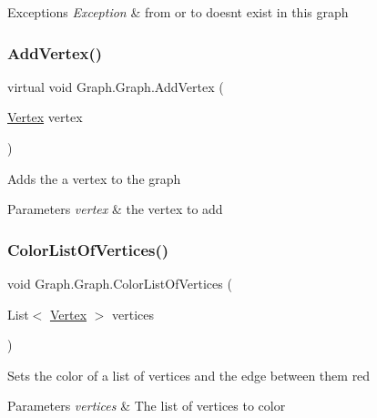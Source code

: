\begin{DoxyExceptions}{Exceptions}
{\em Exception} & from or to doesn\textquotesingle{}t exist in this graph\\
\hline
\end{DoxyExceptions}
\mbox{\label{class_graph_1_1_graph_aac26679440a896ed404021c777070345}} 
\subsubsection{\texorpdfstring{Add\+Vertex()}{AddVertex()}}
{\footnotesize\ttfamily virtual void Graph.\+Graph.\+Add\+Vertex (\begin{DoxyParamCaption}\item[{\hyperlink{class_graph_1_1_vertex}{Vertex}}]{vertex }\end{DoxyParamCaption})\hspace{0.3cm}{\ttfamily [virtual]}}



Adds the a vertex to the graph 


\begin{DoxyParams}{Parameters}
{\em vertex} & the vertex to add\\
\hline
\end{DoxyParams}
\mbox{\label{class_graph_1_1_graph_af328fc96d21cc0b8edba5ae71317b7e9}} 
\subsubsection{\texorpdfstring{Color\+List\+Of\+Vertices()}{ColorListOfVertices()}}
{\footnotesize\ttfamily void Graph.\+Graph.\+Color\+List\+Of\+Vertices (\begin{DoxyParamCaption}\item[{List$<$ \hyperlink{class_graph_1_1_vertex}{Vertex} $>$}]{vertices }\end{DoxyParamCaption})}



Sets the color of a list of vertices and the edge between them red 


\begin{DoxyParams}{Parameters}
{\em vertices} & The list of vertices to color\\
\hline
\end{DoxyParams}
\mbox{\label{class_graph_1_1_graph_a0c9eb0d791d58368f214cbb96ac2a320}} 

